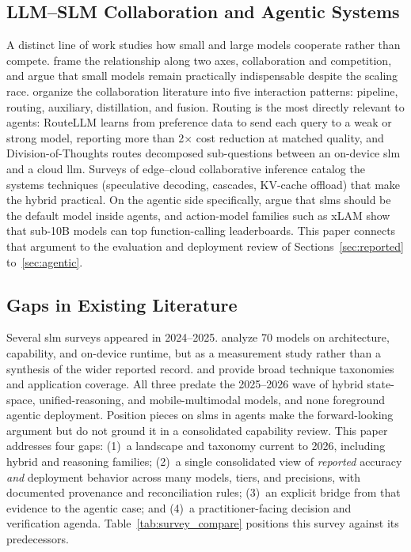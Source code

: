 \subsection{LLM--SLM Collaboration and Agentic Systems}
\label{subsec:background_collab}
A distinct line of work studies how small and large models cooperate rather than compete. \citet{chen2024role_small} frame the relationship along two axes, collaboration and competition, and argue that small models remain practically indispensable despite the scaling race. \citet{chen2025collab_survey} organize the collaboration literature into five interaction patterns: pipeline, routing, auxiliary, distillation, and fusion. Routing is the most directly relevant to agents: RouteLLM \citep{ong2024routellm} learns from preference data to send each query to a weak or strong model, reporting more than 2$\times$ cost reduction at matched quality, and Division-of-Thoughts \citep{division_of_thoughts_2025} routes decomposed sub-questions between an on-device \gls{slm} and a cloud \gls{llm}. Surveys of edge--cloud collaborative inference \citep{xu2024device} catalog the systems techniques (speculative decoding, cascades, KV-cache offload) that make the hybrid practical. On the agentic side specifically, \citet{belcak2025slm_agentic} argue that \glspl{slm} should be the default model inside agents, and action-model families such as xLAM \citep{zhang2024xlam} show that sub-10B models can top function-calling leaderboards. This paper connects that argument to the evaluation and deployment review of Sections~\ref{sec:reported} to~\ref{sec:agentic}.

\subsection{Gaps in Existing Literature}
\label{subsec:background_gaps}
Several \gls{slm} surveys appeared in 2024--2025. \citet{lu2024slmsurvey} analyze 70 models on architecture, capability, and on-device runtime, but as a measurement study rather than a synthesis of the wider reported record. \citet{vannguyen2024slm_survey} and \citet{wang2024comprehensive} provide broad technique taxonomies and application coverage. All three predate the 2025--2026 wave of hybrid state-space, unified-reasoning, and mobile-multimodal models, and none foreground agentic deployment. Position pieces on \glspl{slm} in agents \citep{belcak2025slm_agentic} make the forward-looking argument but do not ground it in a consolidated capability review. This paper addresses four gaps: (1)~a landscape and taxonomy current to 2026, including hybrid and reasoning families; (2)~a single consolidated view of \emph{reported} accuracy \emph{and} deployment behavior across many models, tiers, and precisions, with documented provenance and reconciliation rules; (3)~an explicit bridge from that evidence to the agentic case; and (4)~a practitioner-facing decision and verification agenda. Table~\ref{tab:survey_compare} positions this survey against its predecessors.

